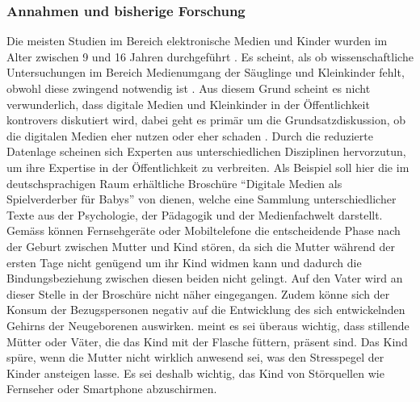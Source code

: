 \subsubsection{Annahmen und bisherige Forschung}\label{sec:Annahmen}
Die meisten Studien im Bereich elektronische Medien und Kinder wurden im Alter zwischen 9 und 16 Jahren durchgeführt \cite{Chaudron2015}. Es scheint, als ob wissenschaftliche Untersuchungen im Bereich Medienumgang der Säuglinge und Kleinkinder fehlt, obwohl diese zwingend notwendig ist \cite{Olafsson2014, Konitzer2017}. Aus diesem Grund scheint es nicht verwunderlich, dass digitale Medien und Kleinkinder in der Öffentlichkeit kontrovers diskutiert wird, dabei geht es primär um die Grundsatzdiskussion, ob die digitalen Medien eher nutzen oder eher schaden \cite{Divsi2015}. Durch die reduzierte Datenlage scheinen sich Experten aus unterschiedlichen Disziplinen hervorzutun, um ihre Expertise in der Öffentlichkeit zu verbreiten. Als Beispiel soll hier die im deutschsprachigen Raum erhältliche Broschüre \enquote{Digitale Medien als Spielverderber für Babys} von  dienen, welche eine Sammlung unterschiedlicher Texte aus der Psychologie, der Pädagogik und der Medienfachwelt darstellt. Gemäss  können Fernsehgeräte oder Mobiltelefone die entscheidende Phase nach der Geburt zwischen Mutter und Kind stören, da sich die Mutter während der ersten Tage nicht genügend um ihr Kind widmen kann und dadurch die Bindungsbeziehung zwischen diesen beiden nicht gelingt. Auf den Vater wird an dieser Stelle in der Broschüre nicht näher eingegangen. Zudem könne sich der Konsum der Bezugspersonen negativ auf die Entwicklung des sich entwickelnden Gehirns der Neugeborenen auswirken.  meint es sei überaus wichtig, dass stillende Mütter oder Väter, die das Kind mit der Flasche füttern, präsent sind. Das Kind spüre, wenn die Mutter nicht wirklich anwesend sei, was den Stresspegel der Kinder ansteigen lasse. Es sei deshalb wichtig, das Kind von Störquellen wie Fernseher oder Smartphone abzuschirmen. 

